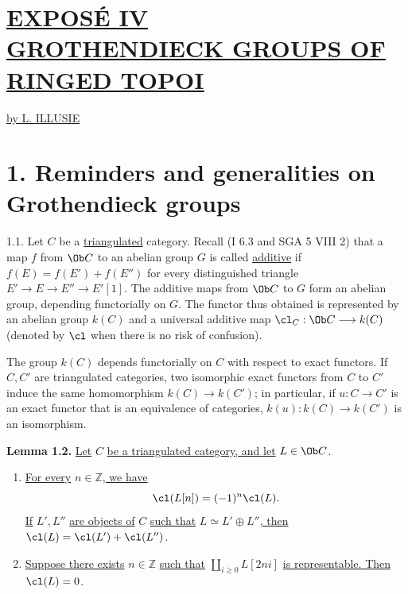 %
\section*{\underline{EXPOSÉ IV}\\[3pt] \underline{\underline{GROTHENDIECK GROUPS OF RINGED TOPOI}}}
\renewcommand{\parf}{\underline{\mathrm{parf}}}
\begin{center}
\underline{by L. ILLUSIE}
\end{center}

\section*{1. Reminders and generalities on Grothendieck groups}

1.1. Let \(C\) be a \uline{triangulated} category. Recall (I 6.3 and SGA 5 VIII 2) that a map \(f\) from \(\Ob C\) to an abelian group \(G\) is called \uline{additive} if \(f(E)=f(E')+f(E'')\) for every distinguished triangle \(E'\longrightarrow E\longrightarrow E''\longrightarrow E'[1]\). The additive maps from \(\Ob C\) to \(G\) form an abelian group, depending functorially on \(G\). The functor thus obtained is represented by an abelian group \(k(C)\) and a universal additive map \(\cl_C:\Ob C\longrightarrow k(C)\) (denoted by \(\cl\) when there is no risk of confusion).

The group \(k(C)\) depends functorially on \(C\) with respect to exact functors. If \(C,C'\) are triangulated categories, two isomorphic exact functors from \(C\) to \(C'\) induce the same homomorphism \(k(C)\to k(C')\); in particular, if \(u:C\to C'\) is an exact functor that is an equivalence of categories, \(k(u):k(C)\to k(C')\) is an isomorphism.

\textbf{Lemma 1.2.} \uline{Let} \(C\) \uline{be a triangulated category, and let} \(L\in\Ob C\).
\begin{enumerate}[label=\alph*)]
\item \uline{For every} \(n\in\mathbb Z\)\uline{, we have}
\[
 \cl(L[n])=(-1)^n\cl(L).
\]
\uline{If} \(L',L''\) \uline{are objects of} \(C\) \uline{such that} \(L\simeq L'\oplus L''\)\uline{, then} \(\cl(L)=\cl(L')+\cl(L'')\).
\item \uline{Suppose there exists} \(n\in\mathbb Z\) \uline{such that} \(\coprod_{i\geq0} L[2ni]\) \uline{is representable. Then} \(\cl(L)=0\).
\end{enumerate}

